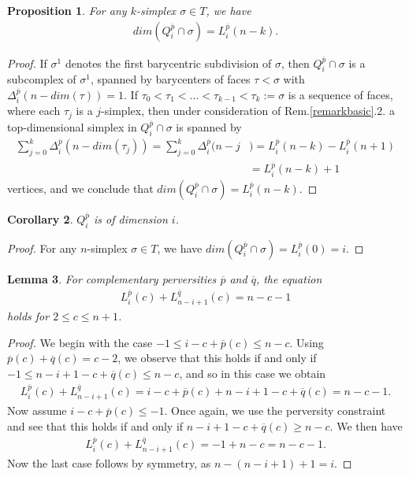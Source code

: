 \documentclass{scrreprt}
\newtheorem{prop}{Proposition}[chapter]
\newtheorem{lemma}[prop]{Lemma}
\newtheorem{corollar}[prop]{Corollary}
\begin{document}
\begin{prop}\label{dimensionbasicset}
For any $k$-simplex $\sigma \in T$,  we have 
\begin{align*}
dim(Q_i^{\overline{p}} \cap \sigma)= L_i^{\overline{p}}(n-k).
\end{align*}
\end{prop}

\begin{proof}
If $\sigma^1$ denotes the first barycentric subdivision of $\sigma$, then $Q_i^{\overline{p}} \cap \sigma$ is a subcomplex of $\sigma^1$, spanned by barycenters of faces $\tau < \sigma$ with $\Delta_i^{\overline{p}}(n-dim(\tau))=1$. If $\tau_0 < \tau_1 < ... < \tau_{k-1} < \tau_k:= \sigma$ is a sequence of faces, where each $\tau_j$ is a $j$-simplex, then under consideration of Rem.\ref{remarkbasic}.2. a top-dimensional simplex in $Q_i^{\overline{p}} \cap \sigma$ is spanned by 
\begin{align*}
\sum_{j=0}^k \Delta_i^{\overline{p}}(n-dim(\tau_j)) = \sum_{j=0}^k \Delta_i^{\overline{p}}(n-j &)= L_i^{\overline{p}}(n-k) - L_i^{\overline{p}}(n+1) \\ &=L_i^{\overline{p}}(n-k) +1
\end{align*}
vertices, and we conclude that $dim(Q_i^{\overline{p}} \cap \sigma)= L_i^{\overline{p}}(n-k).$
\end{proof}

\begin{corollar}
$Q_i^{\overline{p}}$ is of dimension $i$.
\end{corollar}

\begin{proof}
For any $n$-simplex $\sigma \in T$, we have $dim(Q_i^{\overline{p}} \cap \sigma)=L_i^{\overline{p}}(0)=i$.
\end{proof}

\begin{lemma}\label{lemmabasicsets}
For complementary perversities $\overline{p}$ and $\overline{q}$, the equation
\begin{align*}
L_i^{\overline{p}}(c) + L_{n-i+1}^{\overline{q}}(c)=n-c-1
\end{align*}
holds for $2 \leq c \leq n+1$.
\end{lemma}

\begin{proof}
We begin with the case $-1 \leq i-c + \overline{p}(c) \leq n-c$. Using $\overline{p}(c)+ \overline{q}(c)=c-2$, we observe that this holds if and only if $-1 \leq n-i+1-c + \overline{q}(c) \leq n-c$, and so in this case we obtain
\begin{align*}
L_i^{\overline{p}}(c) + L_{n-i+1}^{\overline{q}}(c)=i-c+ \overline{p}(c)+ n-i+1-c+ \overline{q}(c)   =n-c-1.
\end{align*}
Now assume $i-c + \overline{p}(c) \leq -1$. Once again, we use the perversity constraint and see that this holds if and only if $n-i+1-c+ \overline{q}(c) \geq n-c$. We then have
\begin{align*}
L_i^{\overline{p}}(c) + L_{n-i+1}^{\overline{q}}(c)=-1 + n-c =n-c-1.
\end{align*}
Now the last case follows by symmetry, as $n-(n-i+1)+1=i$.
\end{proof}
\end{document}
